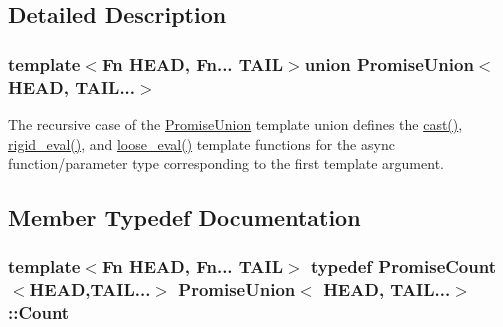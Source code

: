 \subsection{Detailed Description}
\subsubsection*{template$<$Fn H\-E\-A\-D, Fn... T\-A\-I\-L$>$union Promise\-Union$<$ H\-E\-A\-D, T\-A\-I\-L...$>$}

The recursive case of the {\ttfamily \hyperlink{unionPromiseUnion}{Promise\-Union}} template union defines the {\ttfamily \hyperlink{unionPromiseUnion_3_01HEAD_00_01TAIL_8_8_8_4_aa5cc967e362d0902fb20d586a4a9852b}{cast()}}, {\ttfamily \hyperlink{unionPromiseUnion_3_01HEAD_00_01TAIL_8_8_8_4_af60e0a5350bceaf62bb93074064dbada}{rigid\-\_\-eval()}}, and {\ttfamily \hyperlink{unionPromiseUnion_3_01HEAD_00_01TAIL_8_8_8_4_a8df643d5323314d950d3a0955b19f44e}{loose\-\_\-eval()}} template functions for the async function/parameter type corresponding to the first template argument. 

\subsection{Member Typedef Documentation}
\hypertarget{unionPromiseUnion_3_01HEAD_00_01TAIL_8_8_8_4_a0fc2662670f580f9679389bc21d3c825}{
\subsubsection[{Count}]{\setlength{\rightskip}{0pt plus 5cm}template$<$Fn H\-E\-A\-D, Fn... T\-A\-I\-L$>$ typedef {\bf Promise\-Count}$<$H\-E\-A\-D,T\-A\-I\-L...$>$ {\bf Promise\-Union}$<$ H\-E\-A\-D, T\-A\-I\-L...$>$\-::{\bf Count}}}\label{unionPromiseUnion_3_01HEAD_00_01TAIL_8_8_8_4_a0fc2662670f580f9679389bc21d3c825}


